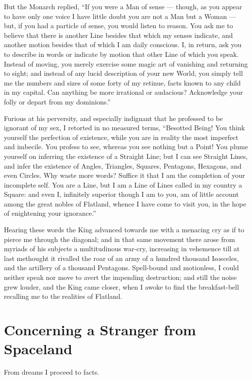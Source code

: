 \documentclass[12pt, a4paper, oneside]{memoir}
\begin{document}
But the Monarch replied, ``If you were a Man of sense --- though, as you appear
to have only one voice I have little doubt you are not a Man but a Woman ---
but, if you had a particle of sense, you would listen to reason. You ask me to
believe that there is another Line besides that which my senses indicate, and
another motion besides that of which I am daily conscious. I, in return, ask
you to describe in words or indicate by motion that other Line of which you
speak. Instead of moving, you merely exercise some magic art of vanishing and
returning to sight; and instead of any lucid description of your new World,
you simply tell me the numbers and sizes of some forty of my retinue, facts
known to any child in my capital. Can anything be more irrational or
audacious? Acknowledge your folly or depart from my dominions.''

Furious at his perversity, and especially indignant that he professed to be
ignorant of my sex, I retorted in no measured terms, ``Besotted Being! You
think yourself the perfection of existence, while you are in reality the most
imperfect and imbecile. You profess to see, whereas you see nothing but a
Point! You plume yourself on inferring the existence of a Straight Line; but I
can see Straight Lines, and infer the existence of Angles, Triangles, Squares,
Pentagons, Hexagons, and even Circles. Why waste more words? Suffice it that I
am the completion of your incomplete self. You are a Line, but I am a Line of
Lines called in my country a Square: and even I, infinitely superior though I
am to you, am of little account among the great nobles of Flatland, whence I
have come to visit you, in the hope of enightening your ignorance.''

Hearing these words the King advanced towards me with a menacing cry as if to
pierce me through the diagonal; and in that same movement there arose from
myriads of his subjects a multitudinous war-cry, increasing in vehemence till
at last methought it rivalled the roar of an army of a hundred thousand
Isosceles, and the artillery of a thousand Pentagons. Spell-bound and
motionless, I could neither speak nor move to avert the impending destruction;
and still the noise grew louder, and the King came closer, when I awoke to
find the breakfast-bell recalling me to the realities of Flatland.







\chapter{Concerning a Stranger from Spaceland}
From dreams I proceed to facts.
\end{document}
